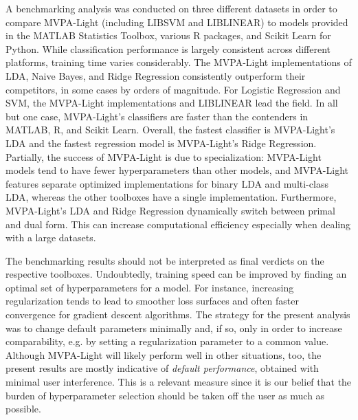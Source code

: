 \documentclass[utf8]{frontiersSCNS} %
\begin{document}
A benchmarking analysis was conducted on three different datasets in order to compare MVPA-Light (including LIBSVM and LIBLINEAR) to models provided in the MATLAB Statistics Toolbox, various R packages, and Scikit Learn  for Python. While classification performance is largely consistent across different platforms, training time varies considerably. The MVPA-Light implementations of LDA, Naive Bayes, and Ridge Regression consistently outperform  their competitors, in some cases by orders of magnitude. For Logistic Regression and SVM, the MVPA-Light implementations and LIBLINEAR lead the field. In all but one case, MVPA-Light's classifiers are faster than the contenders in MATLAB, R, and Scikit Learn. Overall, the fastest classifier is MVPA-Light's LDA and the fastest regression model is MVPA-Light's Ridge Regression. Partially, the success of MVPA-Light is due to specialization: MVPA-Light models tend to have fewer hyperparameters than other models, and MVPA-Light features separate optimized implementations for binary LDA and multi-class LDA, whereas the other toolboxes have a single implementation. Furthermore, MVPA-Light's LDA and Ridge Regression dynamically switch between primal and dual form. This can increase computational efficiency especially when dealing with a large datasets.

The benchmarking results should not be interpreted as final verdicts on the respective toolboxes.
 Undoubtedly, training speed can be improved by finding an optimal set of hyperparameters for a model. For instance, increasing regularization tends to lead to smoother loss surfaces and often faster convergence for gradient descent algorithms. The strategy for the present analysis was to change default parameters minimally and, if so, only in order to increase comparability, e.g. by setting a regularization parameter to a common value.
 Although MVPA-Light will likely perform well in other situations, too, the present results are mostly indicative of \textit{default performance}, obtained with minimal user interference. This is a relevant measure since it is our belief that the burden of hyperparameter selection should be taken off the user as much as possible.


\end{document}
